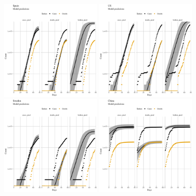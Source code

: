 \documentclass[a4paper]{tufte-handout}
\begin{document}
\begin{figure}
\begin{center}
    \includegraphics[width=0.45\textwidth]{../figs/model_pred_ESP.pdf}
    \includegraphics[width=0.45\textwidth]{../figs/model_pred_USA.pdf}
    \includegraphics[width=0.45\textwidth]{../figs/model_pred_SWE.pdf}
    \includegraphics[width=0.45\textwidth]{../figs/model_pred_CHN.pdf}

\end{center}
\end{figure}
\end{document}
